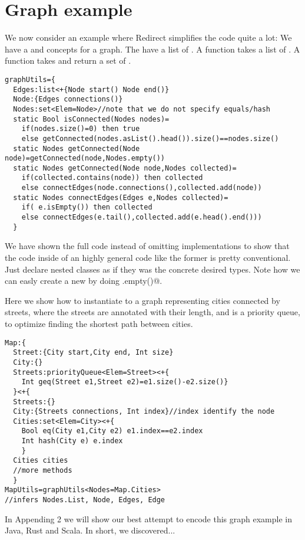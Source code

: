 \section{Graph example}
We now consider an example where Redirect simplifies the code quite a lot:
We have a \Q@Node@ and \Q@Edge@ concepts for a graph.
The \Q@Node@ have a list of \Q@Edge@s.
A \Q@isConnected@ function takes a list of \Q@Node@s.
A \Q@getConnected@ function takes \Q@Node@ and return a set of \Q@Node@s.
\begin{lstlisting}
graphUtils={
  Edges:list<+{Node start() Node end()}
  Node:{Edges connections()}
  Nodes:set<Elem=Node>//note that we do not specify equals/hash
  static Bool isConnected(Nodes nodes)=
    if(nodes.size()=0) then true
    else getConnected(nodes.asList().head()).size()==nodes.size()
  static Nodes getConnected(Node node)=getConnected(node,Nodes.empty())
  static Nodes getConnected(Node node,Nodes collected)=
    if(collected.contains(node)) then collected
    else connectEdges(node.connections(),collected.add(node))
  static Nodes connectEdges(Edges e,Nodes collected)=
    if( e.isEmpty()) then collected
    else connectEdges(e.tail(),collected.add(e.head().end()))
  }
\end{lstlisting}

We have shown the full code instead of omitting implementations to show that
the code inside of an highly general code like the former is pretty conventional.
Just declare nested classes as if they was the concrete desired types. Note how we can easly create a new \@Nodes@ by doing \Q@Nodes.empty()@.

Here we show how to instantiate \Q@graphUtils@ to a graph representing cities connected by streets,
where the streets are annotated with their length, and \Q@Edges@ is a priority queue, to optimize
finding the shortest path between cities.

\begin{lstlisting}
Map:{
  Street:{City start,City end, Int size}
  City:{}
  Streets:priorityQueue<Elem=Street><+{    
    Int geq(Street e1,Street e2)=e1.size()-e2.size()}
  }<+{
  Streets:{}
  City:{Streets connections, Int index}//index identify the node
  Cities:set<Elem=City><+{
    Bool eq(City e1,City e2) e1.index==e2.index
    Int hash(City e) e.index
    }
  Cities cities
  //more methods
  }
MapUtils=graphUtils<Nodes=Map.Cities>
//infers Nodes.List, Node, Edges, Edge
\end{lstlisting}

In Appending 2 we will show our best attempt to encode this graph example in Java, Rust and Scala.
In short, we discovered...

